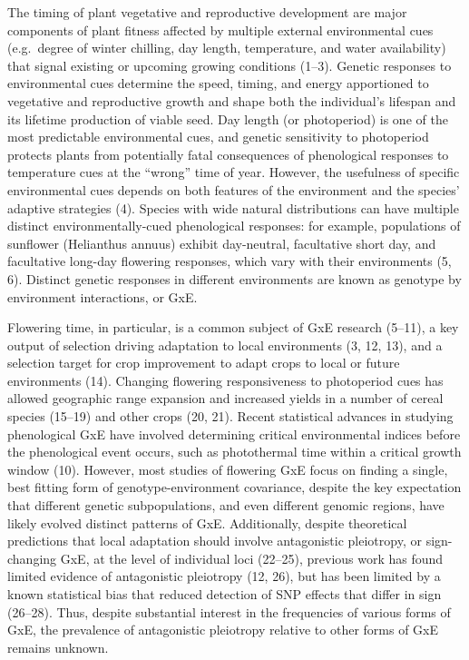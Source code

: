 \documentclass[
  9pt,
  twocolumn,
  twoside]{pnas-new}
\begin{document}
The timing of plant vegetative and reproductive development are major
components of plant fitness affected by multiple external environmental
cues (e.g.~degree of winter chilling, day length, temperature, and water
availability) that signal existing or upcoming growing conditions
(1--3). Genetic responses to environmental cues determine the speed,
timing, and energy apportioned to vegetative and reproductive growth and
shape both the individual's lifespan and its lifetime production of
viable seed. Day length (or photoperiod) is one of the most predictable
environmental cues, and genetic sensitivity to photoperiod protects
plants from potentially fatal consequences of phenological responses to
temperature cues at the ``wrong'' time of year. However, the usefulness
of specific environmental cues depends on both features of the
environment and the species' adaptive strategies (4). Species with wide
natural distributions can have multiple distinct environmentally-cued
phenological responses: for example, populations of sunflower
(Helianthus annuus) exhibit day-neutral, facultative short day, and
facultative long-day flowering responses, which vary with their
environments (5, 6). Distinct genetic responses in different
environments are known as genotype by environment interactions, or GxE.

Flowering time, in particular, is a common subject of GxE research
(5--11), a key output of selection driving adaptation to local
environments (3, 12, 13), and a selection target for crop improvement to
adapt crops to local or future environments (14). Changing flowering
responsiveness to photoperiod cues has allowed geographic range
expansion and increased yields in a number of cereal species (15--19)
and other crops (20, 21). Recent statistical advances in studying
phenological GxE have involved determining critical environmental
indices before the phenological event occurs, such as photothermal time
within a critical growth window (10). However, most studies of flowering
GxE focus on finding a single, best fitting form of genotype-environment
covariance, despite the key expectation that different genetic
subpopulations, and even different genomic regions, have likely evolved
distinct patterns of GxE. Additionally, despite theoretical predictions
that local adaptation should involve antagonistic pleiotropy, or
sign-changing GxE, at the level of individual loci (22--25), previous
work has found limited evidence of antagonistic pleiotropy (12, 26), but
has been limited by a known statistical bias that reduced detection of
SNP effects that differ in sign (26--28). Thus, despite substantial
interest in the frequencies of various forms of GxE, the prevalence of
antagonistic pleiotropy relative to other forms of GxE remains unknown.
\end{document}
